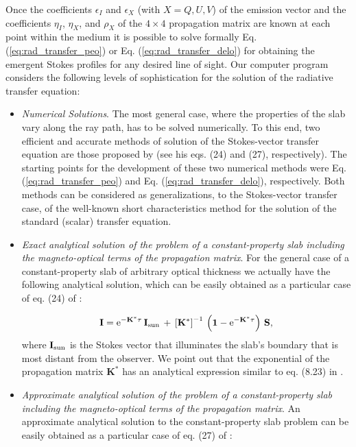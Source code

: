 \documentclass[12pt]{article}
\begin{document}
Once
the coefficients $\epsilon_I$ and $\epsilon_X$ (with
$X=Q,U,V$) of the emission vector 
and the coefficients $\eta_I$, $\eta_X$, and
$\rho_X$ of the $4\times4$ propagation matrix are known 
at each point within the medium it is possible to solve formally Eq.
(\ref{eq:rad_transfer_peo}) or Eq.
(\ref{eq:rad_transfer_delo}) for
obtaining the emergent Stokes profiles for any desired line of sight.
Our computer program considers the following levels of sophistication for the solution of the radiative transfer equation: 

\begin{itemize}

\item {\em Numerical Solutions}.
The most general case, where the properties of the slab vary
along the ray path, has to be solved numerically. To this
end, two efficient and accurate methods of solution of 
the Stokes-vector transfer equation are those proposed by \cite{trujillo03} (see his eqs. (24) and (27), respectively). The starting points for the development of these two numerical methods were Eq. (\ref{eq:rad_transfer_peo}) and Eq. (\ref{eq:rad_transfer_delo}), respectively. Both methods can be considered as generalizations, to the Stokes-vector transfer case, of the well-known short characteristics method for the solution of the standard (scalar) transfer equation. 

\item {\em Exact analytical solution of the problem of a constant-property slab including the magneto-optical terms of the propagation matrix}. For the general case of a constant-property slab of arbitrary optical thickness we actually have the following analytical solution, which can be easily obtained as a particular case of eq. (24) of \cite{trujillo03}:

\begin{equation}
{\bf I}={\rm e}^{-{\mathbf{K}^{*}}\tau}\,{\bf I}_{\rm sun}\,+\,\left[{\mathbf{K}^{*}}\right]^{-1}\,
\left( \mathbf{1} - {\rm e}^{-{\mathbf{K}^{*}}\tau} \right) \,\mathbf{S},
\label{eq:slab_peo}
\end{equation}
where $\mathbf{I}_{\rm sun}$ is the Stokes
vector that illuminates the slab's boundary that is most distant from the
observer. We point out that the exponential of the propagation 
matrix ${\mathbf{K}^{*}}$ has an analytical expression similar to eq. (8.23) in \cite{landi_landolfi04}.

\item {\em Approximate analytical solution of the problem of a constant-property slab including the magneto-optical terms of the propagation matrix}. An approximate analytical solution to the constant-property slab problem can be easily obtained as a particular case of eq. (27) of \cite{trujillo03}:


\end{itemize}
\end{document}
